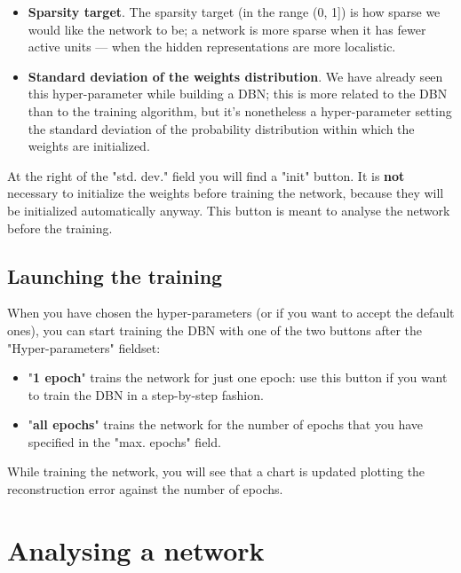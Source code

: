 \documentclass[a4paper]{article}
\begin{document}
\begin{itemize}
	\item \textbf{Sparsity target}. The sparsity target (in the range (0, 1]) is how sparse we would like the network to be; a network is more sparse when it has fewer active units --- when the hidden representations are more localistic.
			
	\item \textbf{Standard deviation of the weights distribution}. We have already seen this hyper-parameter while building a DBN; this is more related to the DBN than to the training algorithm, but it's nonetheless a hyper-parameter setting the standard deviation of the probability distribution within which the weights are initialized.
		
	\end{itemize}

		
At the right of the "std. dev." field you will find a "init" button. It is \textbf{not} necessary to initialize the weights before training the network, because they will be initialized automatically anyway. This button is meant to analyse the network before the training.

		
	\subsection{Launching the training}

		
When you have chosen the hyper-parameters (or if you want to accept the default ones), you can start training the DBN with one of the two buttons after the "Hyper-parameters" fieldset:
		
	\begin{itemize}
		
			
	\item "\textbf{1 epoch}" trains the network for just one epoch: use this button if you want to train the DBN in a step-by-step fashion.
			
	\item "\textbf{all epochs}" trains the network for the number of epochs that you have specified in the "max. epochs" field.
		
	\end{itemize}

		
While training the network, you will see that a chart is updated plotting the reconstruction error against the number of epochs.
	


		
	\section{Analysing a network}
\end{document}

